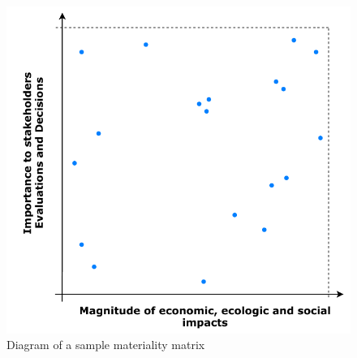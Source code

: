 \documentclass[11pt]{article}
\theoremstyle{definition}
\begin{document}
\begin{figure}[H]
	\centering
	\includegraphics[width=0.6\linewidth]{img/materiality_matrix}
	\caption{Diagram of a sample materiality matrix}
\end{figure}
\end{document}
